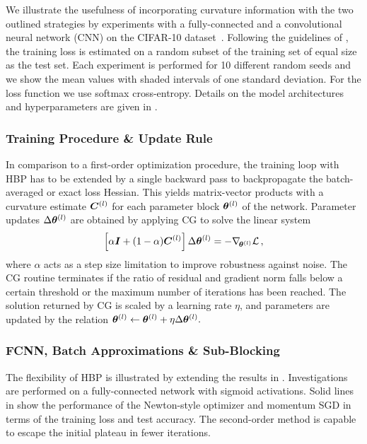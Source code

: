 We illustrate the usefulness of incorporating curvature information with the two
outlined strategies by experiments with a fully-connected and a convolutional
neural network (CNN) on the CIFAR-10 dataset~\citep{krizhevsky2009learning}.
Following the guidelines of \citet{schneider2019deepobs}, the training loss is
estimated on a random subset of the training set of equal size as the test set.
Each experiment is performed for 10 different random seeds and we show the mean
values with shaded intervals of one standard deviation. For the loss function we
use softmax cross-entropy. Details on the model architectures and
hyperparameters are given in .

\subsubsection{Training Procedure \& Update Rule}

In comparison to a first-order optimization procedure, the training loop with
HBP has to be extended by a single backward pass to backpropagate the
batch-averaged or exact loss Hessian. This yields matrix-vector products with a
curvature estimate ${\bm{C}}^{(l)}$ for each parameter block ${\bm{\theta}}^{(l)}$ of the
network. Parameter updates $\Delta {\bm{\theta}}^{(l)}$ are obtained by applying CG to
solve the linear system
\begin{align}
  \label{hbp::equ:linearSystemCG}
  \left[ \alpha {\bm{I}} + (1 - \alpha) {\bm{C}}^{(l)} \right]  \Delta
  {\bm{\theta}}^{(l)} = - \nabla_{\!{{\bm{\theta}}^{(l)}}}{\mathcal{L}}\,,
\end{align}
where $\alpha$ acts as a step size limitation to improve robustness against
noise. The CG routine terminates if the ratio of residual and gradient norm
falls below a certain threshold or the maximum number of iterations has been
reached. The solution returned by CG is scaled by a learning rate $\eta$, and
parameters are updated by the relation ${\bm{\theta}}^{(l)} \leftarrow {\bm{\theta}}^{(l)} +
\eta \Delta {\bm{\theta}}^{(l)}.$

\subsubsection{FCNN, Batch Approximations \& Sub-Blocking}

The flexibility of HBP is illustrated by extending the results in
\citet{wei2018bdapch}. Investigations are performed on a fully-connected
network with sigmoid activations. Solid lines in  show
the performance of the Newton-style optimizer and momentum SGD in terms of the
training loss and test accuracy. The second-order method is capable to escape
the initial plateau in fewer iterations.

